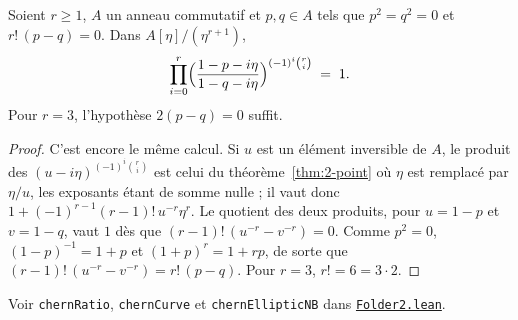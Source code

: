 \begin{encadre}
\begin{theoreme}\label{thm:2-nb}
Soient $r \geq 1$, $A$ un anneau commutatif et $p, q \in A$ tels que $p^2 = q^2 = 0$ et $r!\,(p - q) = 0$. Dans $A[\eta]/(\eta^{r+1})$,
\[
  \prod_{i=0}^{r} \Bigl(\frac{1 - p - i\eta}{1 - q - i\eta}\Bigr)^{(-1)^i\binom ri} \;=\; 1 .
\]
Pour $r = 3$, l'hypothèse $2(p - q) = 0$ suffit.
\end{theoreme}
\end{encadre}

\begin{proof}C'est encore le même calcul. Si $u$ est un élément inversible de $A$, le produit des $(u - i\eta)^{(-1)^i\binom ri}$ est celui du théorème~\ref{thm:2-point} où $\eta$ est remplacé par $\eta/u$, les exposants étant de somme nulle ; il vaut donc $1 + (-1)^{r-1}(r-1)!\,u^{-r}\eta^r$. Le quotient des deux produits, pour $u = 1 - p$ et $v = 1 - q$, vaut $1$ dès que $(r-1)!\,(u^{-r} - v^{-r}) = 0$. Comme $p^2 = 0$, $(1 - p)^{-1} = 1 + p$ et $(1 + p)^r = 1 + rp$, de sorte que $(r-1)!\,(u^{-r} - v^{-r}) = r!\,(p - q)$. Pour $r = 3$, $r! = 6 = 3 \cdot 2$.\end{proof}

\begingroup\raggedright
\noindent Voir \texttt{chernRatio}, \texttt{chernCurve} et \texttt{chernEllipticNB} dans \href{\leanblob/AlgebraicGeometry/Folder2.lean}{\texttt{Folder2.\allowbreak{}lean}}.\par\endgroup

